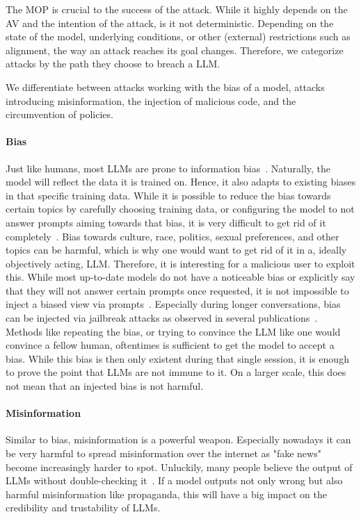 The MOP is crucial to the success of the attack.
While it highly depends on the AV and the intention of the attack, is it not deterministic.
Depending on the state of the model, underlying conditions, or other (external) restrictions such as alignment, the way an attack reaches its goal changes. 
Therefore, we categorize attacks by the path they choose to breach a LLM.

We differentiate between attacks working with the bias of a model, attacks introducing misinformation, the injection of malicious code, and the circumvention of policies.
\paragraph{Bias}
Just like humans, most LLMs are prone to information bias~\cite{gallegos2023bias}. 
Naturally, the model will reflect the data it is trained on. 
Hence, it also adapts to existing biases in that specific training data. 
While it is possible to reduce the bias towards certain topics by carefully choosing training data, or configuring the model to not answer prompts aiming towards that bias, it is very difficult to get rid of it completely~\cite{gallegos2023bias}.
Bias towards culture, race, politics, sexual preferences, and other topics can be harmful, which is why one would want to get rid of it in a, ideally objectively acting, LLM. 
Therefore, it is interesting for a malicious user to exploit this. 
While most up-to-date models do not have a noticeable bias or explicitly say that they will not answer certain prompts once requested, it is not impossible to inject a biased view via prompts~\cite{chao2023jailbreaking}. 
Especially during longer conversations, bias can be injected via jailbreak attacks as observed in several publications~\cite{wei2023jailbroken,chao2023jailbreaking}.
Methods like repeating the bias, or trying to convince the LLM like one would convince a fellow human, oftentimes is sufficient to get the model to accept a bias. 
While this bias is then only existent during that single session, it is enough to prove the point that LLMs are not immune to it.
On a larger scale, this does not mean that an injected bias is not harmful.
\paragraph{Misinformation}
Similar to bias, misinformation is a powerful weapon. 
Especially nowadays it can be very harmful to spread misinformation over the internet as "fake news" become increasingly harder to spot. 
Unluckily, many people believe the output of LLMs without double-checking it~\cite{Overreliance}.
If a model outputs not only wrong but also harmful misinformation like propaganda, this will have a big impact on the credibility and trustability of LLMs. 


